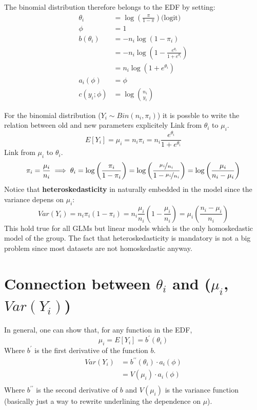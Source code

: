       The binomial distribution therefore belongs to the EDF by setting:
      \begin{align*}
        \theta_i     &= \log\left(\frac{\pi}{1-\pi}\right) \text{(logit)} \\
        \phi         &= 1 \\
        b(\theta_i)  &= - n_i \log(1-\pi_i) \\
                     &= -n_i \log(1-\frac{e^{\theta_i}}{1 + e^{\theta_i}}) \\
                     &= n_i \log(1 + e^{\theta_i}) \\
        a_i(\phi)    &= \phi \\
        c(y_i; \phi) &= \log\binom{n_i}{y_i}
      \end{align*}

      For the binomial distribution ($Y_i \sim Bin(n_i, \pi_i)$) it is possble to write the relation between old and new parameters explicitely
      Link from $\theta_i$ to $\mu_i$.
      $$E[Y_i] = \mu_i = n_i\pi_i = n_i\frac{e^{\theta_i}}{1 + e^{\theta_i}}$$
      Link from $\mu_i$ to $\theta_i$.
      $$\pi_i = \frac{\mu_i}{n_i} \implies \theta_i = \log\left(\frac{\pi_i}{1-\pi_i}\right) = \log\left(\frac{\nicefrac{\mu_i}{n_i}}{1-\nicefrac{\mu_i}{n_i}}\right)=\log\left(\frac{\mu_i}{n_i-\mu_i}\right)$$
      Notice that \textbf{heteroskedasticity} in naturally embedded in the model since the variance depens on $\mu_i$:
      $$Var(Y_i) = n_i\pi_i(1-\pi_i) = n_i\frac{\mu_i}{n_i}\left(1-\frac{\mu_i}{n_i}\right) = \mu_i\left(\frac{n_i - \mu_i}{n_i}\right)$$
      This hold true for all GLMs but linear models which is the only homoskedastic model of the group. The fact that heteroskedasticity is mandatory is not a big problem since most datasets are not homoskedastic anyway.

  \section{Connection between $\theta_i$ and ($\mu_i$, $Var(Y_i)$)}
    In general, one can show that, for any function in the EDF,
    $$\mu_i = E[Y_i] = b^\prime(\theta_i)$$
    Where $b^\prime$ is the first derivative of the function $b$.
    \begin{align*}
    Var(Y_i) &= b^{\prime\prime}(\theta_i) \cdot a_i(\phi) \\
             &= V(\mu_i) \cdot a_i(\phi) \\
    \end{align*}
    Where $b^{\prime\prime}$ is the second derivative of $b$ and $V(\mu_i)$ is the variance function (basically just a way to rewrite underlining the dependence on $\mu$).

